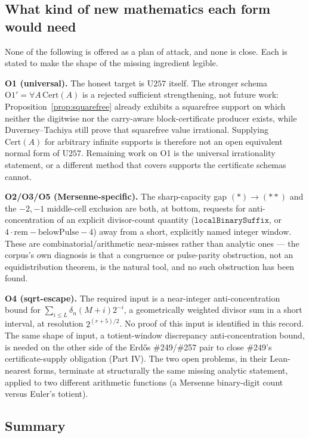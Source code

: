 \subsection{What kind of new mathematics each form would need}

None of the following is offered as a plan of attack, and none is close. Each is stated to make
the shape of the missing ingredient legible.

\textbf{O1 (universal).} The honest target is $\mathrm{U257}$ itself. The stronger schema
$\mathrm{O1'}=\forall A\,\mathrm{Cert}(A)$ is a rejected sufficient strengthening, not future work:
Proposition~\ref{prop:squarefree} already exhibits a squarefree support on which neither the
digitwise nor the carry-aware block-certificate producer exists, while Duverney--Tachiya still
prove that squarefree value irrational. Supplying $\mathrm{Cert}(A)$ for arbitrary infinite
supports is therefore not an open equivalent normal form of $\mathrm{U257}$. Remaining work on O1
is the universal irrationality statement, or a different method that covers supports the
certificate schemas cannot.

\textbf{O2/O3/O5 (Mersenne-specific).} The sharp-capacity gap $(\ast)\to(\ast\ast)$ and the
$-2,-1$ middle-cell exclusion are both, at bottom, requests for anti-concentration of an explicit
divisor-count quantity ($\mathtt{localBinarySuffix}$, or $4\cdot\mathrm{rem}-\mathrm{belowPulse}-4$)
away from a short, explicitly named integer window. These are combinatorial/arithmetic
near-misses rather than analytic ones — the corpus's own diagnosis is that a congruence or
pulse-parity obstruction, not an equidistribution theorem, is the natural tool, and no such
obstruction has been found.

\textbf{O4 (sqrt-escape).} The required input is a near-integer anti-concentration bound for
$\sum_{i\le L}\delta_n(M+i)2^{-i}$, a geometrically weighted divisor sum in a short interval, at
resolution $2^{(r+5)/2}$. No proof of this input is identified in this record. The same shape of
input, a totient-window discrepancy anti-concentration bound, is needed on the other side of the
Erd\H{o}s \#249/\#257 pair to close \#249's certificate-supply obligation (Part IV). The two open problems, in their
Lean-nearest forms, terminate at structurally the same missing analytic statement, applied to two
different arithmetic functions (a Mersenne binary-digit count versus Euler's totient).

\subsection{Summary}

